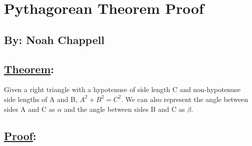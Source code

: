 \documentclass{article}
\begin{document}
\section*{Pythagorean Theorem Proof}
\subsection*{By: Noah Chappell}

\subsection*{\underline{Theorem}:}
Given a right triangle with a hypotenuse of side length C and non-hypotenuse side lengths of A and B, $A^2+B^2=C^2$.
We can also represent the angle between sides A and C as {$\alpha$} and the angle between sides B and C as {$\beta$}.

\begin{center}
\end{center}

\subsection*{\underline{Proof}:}
\end{document}
